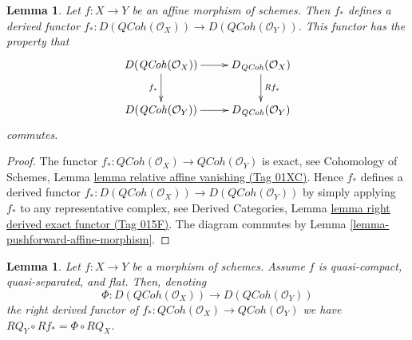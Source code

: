 \documentclass{amsart}
\theoremstyle{plain}
\newtheorem{lemma}[subsection]{Lemma}
\theoremstyle{definition}
\theoremstyle{remark}
\numberwithin{equation}{subsection}
\def\QCoh{\mathit{QCoh}}
\begin{document}
\begin{lemma}
\label{lemma-affine-pushforward}
Let $f : X \to Y$ be an affine morphism of schemes.
Then $f_*$ defines a derived functor
$f_* : D(\QCoh(\mathcal{O}_X)) \to D(\QCoh(\mathcal{O}_Y))$.
This functor has the property that
$$
\xymatrix{
D(\QCoh(\mathcal{O}_X)) \ar[d]_{f_*} \ar[r] &
D_\QCoh(\mathcal{O}_X) \ar[d]^{Rf_*} \\
D(\QCoh(\mathcal{O}_Y)) \ar[r] &
D_\QCoh(\mathcal{O}_Y)
}
$$
commutes.
\end{lemma}

\begin{proof}
The functor
$f_* : \QCoh(\mathcal{O}_X) \to \QCoh(\mathcal{O}_Y)$
is exact, see
Cohomology of Schemes, Lemma \href{https://stacks.math.columbia.edu/tag/01XC}{lemma relative affine vanishing (Tag 01XC)}.
Hence $f_*$ defines a derived functor
$f_* : D(\QCoh(\mathcal{O}_X)) \to D(\QCoh(\mathcal{O}_Y))$
by simply applying $f_*$ to any representative complex, see
Derived Categories, Lemma \href{https://stacks.math.columbia.edu/tag/015F}{lemma right derived exact functor (Tag 015F)}.
The diagram commutes by Lemma \ref{lemma-pushforward-affine-morphism}.
\end{proof}


\begin{lemma}
\label{lemma-flat-pushforward-coherator}
Let $f : X \to Y$ be a morphism of schemes. Assume $f$ is
quasi-compact, quasi-separated, and flat. Then, denoting
$$
\Phi : D(\QCoh(\mathcal{O}_X)) \to D(\QCoh(\mathcal{O}_Y))
$$
the right derived functor of
$f_* : \QCoh(\mathcal{O}_X) \to \QCoh(\mathcal{O}_Y)$
we have $RQ_Y \circ Rf_* = \Phi \circ RQ_X$.
\end{lemma}
\end{document}
